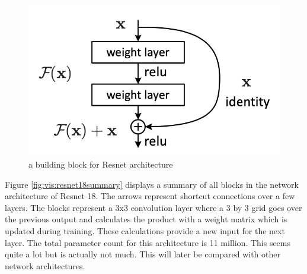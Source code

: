 			\begin{figure}[hbtp]
			\centering
			\includegraphics[scale=0.8]{fig/Research/Vision_Algorithm/algorithms/Resnet/resnet_block.png}
			\caption{a building block for Resnet architecture}
			\label{fig:vis:resnetBlock}
			\end{figure}
			
			Figure \ref{fig:vis:resnet18summary} displays a summary of all blocks in the network architecture of Resnet 18. The arrows represent shortcut connections over a few layers. The blocks represent a 3x3 convolution layer where a 3 by 3 grid goes over the previous output and calculates the product with a weight matrix which is updated during training. These calculations provide a new input for the next layer.  The total parameter count for this architecture is 11 million. This seems quite a lot but is actually not much. This will later be compared with other network architectures.
			
